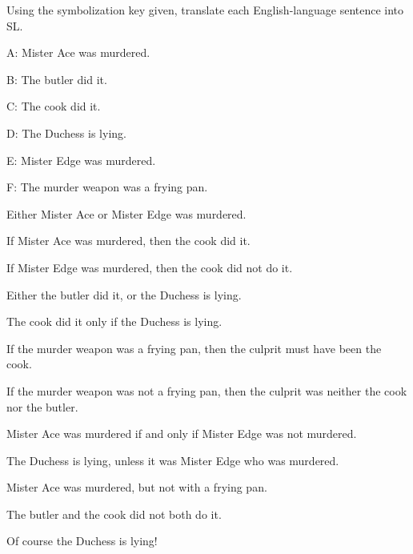 
\problempart Using the symbolization key given, translate each English-language sentence into SL.
\begin{ekey}
\item[A:] Mister Ace was murdered.
\item[B:] The butler did it.
\item[C:] The cook did it.
\item[D:] The Duchess is lying.
\item[E:] Mister Edge was murdered.
\item[F:] The murder weapon was a frying pan.
\end{ekey}
\begin{earg}
\item Either Mister Ace or Mister Edge was murdered. %
\item If Mister Ace was murdered, then the cook did it. %
\item If Mister Edge was murdered, then the cook did not do it. %
\item Either the butler did it, or the Duchess is lying. %
\item The cook did it only if the Duchess is lying. %
\item If the murder weapon was a frying pan, then the culprit must have been the cook. %
\item If the murder weapon was not a frying pan, then the culprit was neither the cook nor the butler. %
\item Mister Ace was murdered if and only if Mister Edge was not murdered. %
\item The Duchess is lying, unless it was Mister Edge who was murdered. %
\item Mister Ace was murdered, but not with a frying pan. %
\item The butler and the cook did not both do it. %
\item Of course the Duchess is lying! %
\end{earg}

